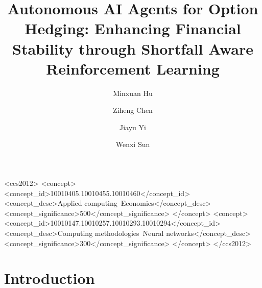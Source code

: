 \documentclass[sigconf,nonacm]{acmart}
\theoremstyle{definition}
\theoremstyle{plain}
\begin{document}


\title{Autonomous AI Agents for Option Hedging: Enhancing Financial Stability through Shortfall Aware Reinforcement Learning
}



\author{Minxuan Hu}

\author{Ziheng Chen}

\author{Jiayu Yi}

\author{Wenxi Sun}

\renewcommand{\shortauthors}{Hu et al.}

\begin{abstract}



\end{abstract}

\begin{CCSXML}
<ccs2012>
   <concept>
       <concept_id>10010405.10010455.10010460</concept_id>
       <concept_desc>Applied computing~Economics</concept_desc>
       <concept_significance>500</concept_significance>
       </concept>
   <concept>
       <concept_id>10010147.10010257.10010293.10010294</concept_id>
       <concept_desc>Computing methodologies~Neural networks</concept_desc>
       <concept_significance>300</concept_significance>
       </concept>
 </ccs2012>
\end{CCSXML}


\maketitle

\section{Introduction}













\onecolumn
% 
\end{document}
